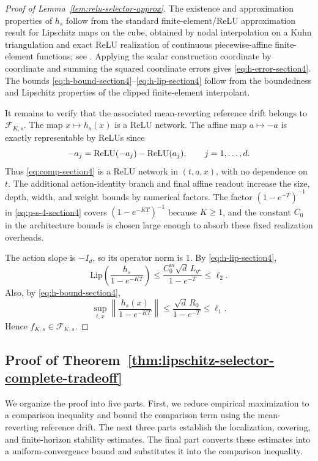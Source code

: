\documentclass{article}
\newcommand{\1}{\mathbbm{1}}
\numberwithin{equation}{section}
\begin{document}
\begin{proof}[Proof of Lemma~\ref{lem:relu-selector-approx}]
The existence and approximation properties of \(h_s\) follow from the standard finite-element/ReLU approximation result for Lipschitz maps on the cube, obtained by nodal interpolation on a Kuhn triangulation and exact ReLU realization of continuous piecewise-affine finite-element functions; see \cite{yarotsky2017error,petersen2018optimal}. Applying the scalar construction coordinate by coordinate and summing the squared coordinate errors gives \eqref{eq:h-error-section4}. The bounds \eqref{eq:h-bound-section4}--\eqref{eq:h-lip-section4} follow from the boundedness and Lipschitz properties of the clipped finite-element interpolant.

It remains to verify that the associated mean-reverting reference drift belongs to \(\mathcal F_{K,s}\). The map \(x\mapsto h_s(x)\) is a ReLU network. The affine map \(a\mapsto-a\) is exactly representable by ReLUs since
\[
 -a_j={\rm ReLU}(-a_j)-{\rm ReLU}(a_j),\qquad j=1,\ldots,d.
\]
Thus \eqref{eq:comp-section4} is a ReLU network in \((t,a,x)\), with no dependence on \(t\). The additional action-identity branch and final affine readout increase the size, depth, width, and weight bounds by numerical factors. The factor \((1-e^{-T})^{-1}\) in \eqref{eq:p-s-4-section4} covers \((1-e^{-KT})^{-1}\) because \(K\ge1\), and the constant \(C_0\) in the architecture bounds is chosen large enough to absorb these fixed realization overheads.

The action slope is \(-I_d\), so its operator norm is \(1\). By \eqref{eq:h-lip-section4},
\[
 \mathrm{Lip}\left(\frac{h_s}{1-e^{-KT}}\right)
 \le \frac{C_0^m\sqrt d\,L_{g^\star}}{1-e^{-T}}
 \le \ell_2.
\]
Also, by \eqref{eq:h-bound-section4},
\[
 \sup_{t,x}\left\|\frac{h_s(x)}{1-e^{-KT}}\right\|
 \le \frac{\sqrt d\,R_0}{1-e^{-T}}
 \le \ell_1.
\]
Hence \(f_{K,s}\in\mathcal F_{K,s}\).
\end{proof}

\subsection{Proof of Theorem~\ref{thm:lipschitz-selector-complete-tradeoff}}
\label{app:proof_stats}

\label{app:proof-lipschitz-selector-complete-tradeoff}

We organize the proof into five parts. First, we reduce empirical maximization
to a comparison inequality and bound the comparison term using the
mean-reverting reference drift. The next three parts establish the localization,
covering, and finite-horizon stability estimates. The final part converts these
estimates into a uniform-convergence bound and substitutes it into the
comparison inequality.
\end{document}
